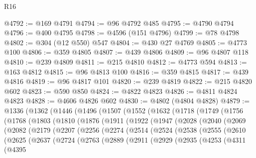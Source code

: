 \begin{lexlean}{R16}
\begin{coremodule}
@4792 := @169 @4791
@4794 := @96 @4792 @485
@4795 := @4790 @4794
@4796 := @400 @4795
@4798 := @4596 (@151 @4796)
@4799 := @78 @4798
@4802 := @304 (@12 @550) @547
@4804 := @430 @27 @4769
@4805 := @4773 @100
@4806 := @359 @4805
@4807 := @439 @4806
@4809 := @96 @4807 @118
@4810 := @239 @4809
@4811 := @215 @4810
@4812 := @4773 @594
@4813 := @163 @4812
@4815 := @96 @4813 @100
@4816 := @359 @4815
@4817 := @439 @4816
@4819 := @96 @4817 @101
@4820 := @239 @4819
@4822 := @215 @4820 @602
@4823 := @590 @850
@4824 := @4822 @4823
@4826 := @4811 @4824 @4823
@4828 := @4606 @4826 @602
@4830 := @4802 (@4804 @4828)
@4879 := @1336
    (@1362
      (@1446
        (@1496
          (@1507
            (@1552
              (@1632
                (@1718
                  (@1749
                    (@1756
                      (@1768
                        (@1803
                          (@1810
                            (@1876
                              (@1911
                                (@1922
                                  (@1947
                                    (@2028
                                      (@2040
                                        (@2069
                                          (@2082
                                            (@2179
                                              (@2207
                                                (@2256
                                                  (@2274
                                                    (@2514
                                                      (@2524
                                                        (@2538
                                                          (@2555
                                                            (@2610
                                                              (@2625
                                                                (@2637
                                                                  (@2724
                                                                    (@2763
                                                                      (@2889
                                                                        (@2911
                                                                          (@2929
                                                                            (@2935
                                                                              (@4253
                                                                                (@4311
                                                                                  (@4395

\end{coremodule}
\end{lexlean}
